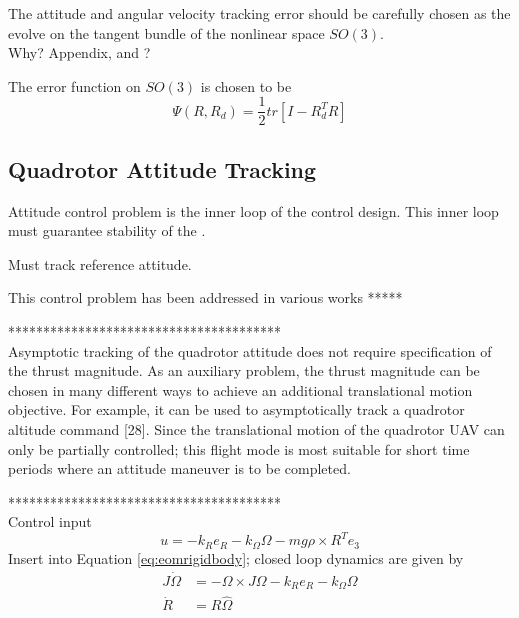The attitude and angular velocity tracking error should be carefully chosen as the evolve on the tangent bundle of the nonlinear space $ SO(3) $. \cite{Lee2010}\\
Why? Appendix\cite{Lee2010}, and \cite{Bullo2005}?


The error function on $ SO(3) $ is chosen to be \cite{Lee2010}
\begin{equation}\label{eq:errorfunc}
\Psi(R,R_d)=\frac{1}{2}tr\left[I-R_d^TR\right]
\end{equation}


		\subsection{Quadrotor Attitude Tracking}
		Attitude control problem is the inner loop of the control design. This inner loop must guarantee stability of the .
		
		Must track reference attitude.
		
		This control problem has been addressed in various works *****

***************************************\\
Asymptotic tracking of the quadrotor attitude does not require specification of the thrust magnitude. As an auxiliary problem, the thrust magnitude can be chosen in many different ways to achieve an additional translational motion objective. For example, it can be used to asymptotically track a quadrotor altitude command [28]. Since the translational motion of the quadrotor UAV can only be partially controlled; this flight mode is most suitable for short time periods where an attitude maneuver is to be completed. \cite{Goodarzi2015b}

***************************************\\

Control input \cite{Lee2011}
\begin{equation}\label{eq:inputattitude}
u=-k_Re_R-k_\Omega\Omega-mg\rho\times R^Te_3
\end{equation}
Insert into Equation \ref{eq:eomrigidbody}; closed loop dynamics are given by
\begin{align}\label{eq:CLdynamics}
J\dot{\Omega} &= -\Omega\times J\Omega-k_Re_R-k_\Omega\Omega \\
\dot{R} &= R\hat{\Omega}
\end{align}

